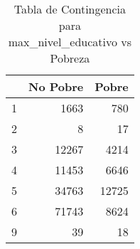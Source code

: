\begin{table}[ht]
\centering
\begin{tabular}{rrr}
  \toprule
 & No Pobre & Pobre \\ 
  \midrule
1 & 1663 & 780 \\ 
  2 &   8 &  17 \\ 
  3 & 12267 & 4214 \\ 
  4 & 11453 & 6646 \\ 
  5 & 34763 & 12725 \\ 
  6 & 71743 & 8624 \\ 
  9 &  39 &  18 \\ 
   \bottomrule
\end{tabular}
\caption{Tabla de Contingencia para max_nivel_educativo vs Pobreza} 
\label{tab:contingency_max_nivel_educativo}
\end{table}

